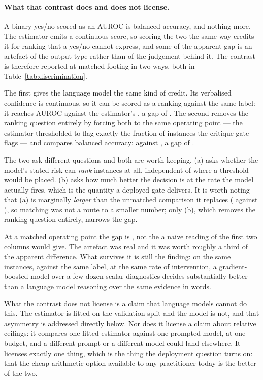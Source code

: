\paragraph{What that contrast does and does not license.}
A binary yes/no scored as an AUROC is balanced accuracy, and nothing more. The
estimator emits a continuous score, so scoring the two the same way credits it for
ranking that a yes/no cannot express, and some of the apparent gap is an artefact of
the output type rather than of the judgement behind it. The contrast is therefore reported at matched footing in two ways, both in
Table~\ref{tab:discrimination}.

The first gives the language model the same kind of credit. Its verbalised confidence
is continuous, so it can be scored as a ranking against the same label: it reaches
AUROC \discrimAurocLlmConfidence{} against the estimator's \discrimAurocArithmetic{},
a gap of \discrimContinuousGap{}. The second removes the ranking question entirely
by forcing both to the same operating point --- the estimator thresholded to flag
exactly the fraction of instances the critique gate flags --- and compares balanced
accuracy: \discrimBalaccArithmetic{} against \discrimBalaccCritique{}, a gap of
\discrimMatchedGap{}.

The two ask different questions and both are worth keeping. (a) asks whether the
model's stated risk can \emph{rank} instances at all, independent of where a threshold
would be placed. (b) asks how much better the decision is at the rate the model
actually fires, which is the quantity a deployed gate delivers. It is worth noting that
(a) is marginally \emph{larger} than the unmatched comparison it replaces
(\discrimContinuousGap{} against \discrimArithmeticAdvantage{}), so matching was not a
route to a smaller number; only (b), which removes the ranking question entirely,
narrows the gap.

At a matched operating point the gap
is \discrimMatchedGap{}, not the \discrimArithmeticAdvantage{} a naive reading of the
first two columns would give. The artefact was real and it was worth roughly a third
of the apparent difference. What survives it is still the finding: on the same
instances, against the same label, at the same rate of intervention, a gradient-boosted
model over a few dozen scalar diagnostics decides substantially better than a language
model reasoning over the same evidence in words.

What the contrast does not license is a claim that language models cannot do this. The
estimator is fitted on the validation split and the model is not, and that asymmetry is
addressed directly below. Nor does it license a claim about relative ceilings: it
compares one fitted estimator against one prompted model, at one budget, and a
different prompt or a different model could land elsewhere. It licenses exactly one
thing, which is the thing the deployment question turns on: that the cheap
arithmetic option available to any practitioner today is the better of the two.


